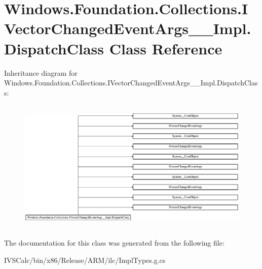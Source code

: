 \hypertarget{class_windows_1_1_foundation_1_1_collections_1_1_i_vector_changed_event_args_____impl_1_1_dispatch_class}{}\section{Windows.\+Foundation.\+Collections.\+I\+Vector\+Changed\+Event\+Args\+\_\+\+\_\+\+Impl.\+Dispatch\+Class Class Reference}
\label{class_windows_1_1_foundation_1_1_collections_1_1_i_vector_changed_event_args_____impl_1_1_dispatch_class}
Inheritance diagram for Windows.\+Foundation.\+Collections.\+I\+Vector\+Changed\+Event\+Args\+\_\+\+\_\+\+Impl.\+Dispatch\+Class\+:\begin{figure}[H]
\begin{center}
\leavevmode
\includegraphics[height=6.443515cm]{class_windows_1_1_foundation_1_1_collections_1_1_i_vector_changed_event_args_____impl_1_1_dispatch_class}
\end{center}
\end{figure}


The documentation for this class was generated from the following file\+:\begin{DoxyCompactItemize}
\item 
I\+V\+S\+Calc/bin/x86/\+Release/\+A\+R\+M/ilc/Impl\+Types.\+g.\+cs\end{DoxyCompactItemize}
